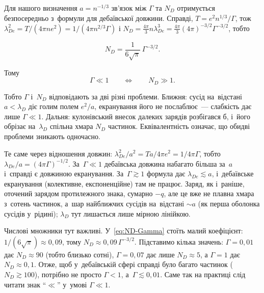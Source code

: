 Для нашого визначення $a=n^{-1/3}$ зв'язок між $\Gamma$ та $N_D$ отримується безпосередньо
з~формули для дебаївської довжини. Справді, $T=e^2n^{1/3}/\Gamma$, тож
$\lambda_{De}^2=T/(4\pi ne^2)=1/(4\pi n^{2/3}\Gamma)$ і
$N_D=\tfrac{4\pi}{3}n\lambda_{De}^3=\tfrac{4\pi}{3}(4\pi)^{-3/2}\Gamma^{-3/2}$, тобто

\begin{equation}\label{eq:ND-Gamma}
    N_D=
    \frac{1}{6\sqrt{\pi}}\,
    \Gamma^{-3/2}.
\end{equation}

Тому
\begin{equation*}
    \Gamma\ll1
    \qquad\Longleftrightarrow\qquad
    N_D\gg1.
\end{equation*}

Тобто $\Gamma$ і~$N_D$ відповідають за дві різні проблеми. Ближня: сусід на~відстані $a<\lambda_D$
діє голим полем $e^2/a$, екранування його не послаблює~--- слабкість дає лише $\Gamma\ll1$. Дальня:
кулонівський внесок далеких зарядів розбігався б, і~його обрізає на~$\lambda_D$ спільна хмара
$N_D$ частинок. Еквівалентність означає, що обидві проблеми зникають одночасно.

Те саме через відношення довжин: $\lambda_{De}^2/a^2=Ta/4\pi e^2=1/4\pi\Gamma$, тобто
$\lambda_{De}/a=(4\pi\Gamma)^{-1/2}$. За~$\Gamma\ll1$ дебаївська довжина набагато більша за~$a$ і~справді є довжиною
екранування. За~$\Gamma\gtrsim1$ формула дає $\lambda_{De}\lesssim a$, і~дебаївське екранування (колективне, експоненційне)
там не працює. Заряд, як і~раніше, оточений зарядом протилежного знака, сумарно $-q$, але це вже не
плавна хмара з~сотень частинок, а~шар найближчих сусідів на~відстані $\sim a$ (як перша оболонка сусідів у~рідині);
$\lambda_D$ тут лишається лише мірною лінійкою.

Числові множники тут важливі. У~\eqref{eq:ND-Gamma} стоїть малий коефіцієнт:
$1/(6\sqrt\pi)\approx0{,}09$, тому $N_D\approx0{,}09\,\Gamma^{-3/2}$. Підставимо кілька значень:
$\Gamma=0{,}01$ дає $N_D\approx90$ (тобто близько сотні), $\Gamma=0{,}07$ дає лише $N_D\approx5$, а
$\Gamma=1$ дає $N_D\approx0{,}1$. Отже, щоб у~дебаївській сфері справді було багато частинок
($N_D\gtrsim100$), потрібно не просто $\Gamma<1$, а~$\Gamma\lesssim0{,}01$. Саме так на практиці
слід читати знак \enquote{$\ll$} у~умові $\Gamma\ll1$.

